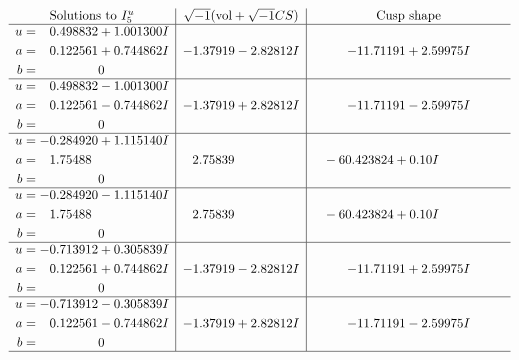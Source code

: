 \documentclass[1p]{elsarticle_modified}
\theoremstyle{definition}
\newcommand{\I}{\sqrt{-1}}
\begin{document}
$$\begin{array}{c|c|c}  
\text{Solutions to }I^u_{5}& \I (\text{vol} + \sqrt{-1}CS) & \text{Cusp shape}\\
 \hline 
\begin{aligned}
u &= \phantom{-}0.498832 + 1.001300 I \\
a &= \phantom{-}0.122561 + 0.744862 I \\
b &= \phantom{-0.000000 } 0\end{aligned}
 & -1.37919 - 2.82812 I & -11.71191 + 2.59975 I \\ \hline\begin{aligned}
u &= \phantom{-}0.498832 - 1.001300 I \\
a &= \phantom{-}0.122561 - 0.744862 I \\
b &= \phantom{-0.000000 } 0\end{aligned}
 & -1.37919 + 2.82812 I & -11.71191 - 2.59975 I \\ \hline\begin{aligned}
u &= -0.284920 + 1.115140 I \\
a &= \phantom{-}1.75488\phantom{ +0.000000I} \\
b &= \phantom{-0.000000 } 0\end{aligned}
 & \phantom{-}2.75839\phantom{ +0.000000I} & \phantom{-}                -6
0.423824 + 0. 10   I\phantom{ +0.000000I} \\ \hline\begin{aligned}
u &= -0.284920 - 1.115140 I \\
a &= \phantom{-}1.75488\phantom{ +0.000000I} \\
b &= \phantom{-0.000000 } 0\end{aligned}
 & \phantom{-}2.75839\phantom{ +0.000000I} & \phantom{-}                -6
0.423824 + 0. 10   I\phantom{ +0.000000I} \\ \hline\begin{aligned}
u &= -0.713912 + 0.305839 I \\
a &= \phantom{-}0.122561 + 0.744862 I \\
b &= \phantom{-0.000000 } 0\end{aligned}
 & -1.37919 - 2.82812 I & -11.71191 + 2.59975 I \\ \hline\begin{aligned}
u &= -0.713912 - 0.305839 I \\
a &= \phantom{-}0.122561 - 0.744862 I \\
b &= \phantom{-0.000000 } 0\end{aligned}
 & -1.37919 + 2.82812 I & -11.71191 - 2.59975 I\\
 \hline 
 \end{array}$$\newpage\newpage\renewcommand{\arraystretch}{1}
\end{document}
